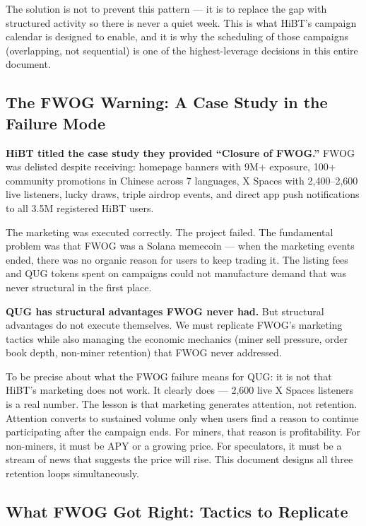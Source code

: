 \documentclass[11pt,a4paper]{article}
\begin{document}
The solution is not to prevent this pattern — it is to replace the gap with structured activity so there is never a quiet week. This is what HiBT's campaign calendar is designed to enable, and it is why the scheduling of those campaigns (overlapping, not sequential) is one of the highest-leverage decisions in this entire document.

\subsection{The FWOG Warning: A Case Study in the Failure Mode}
\label{sec:fwog}

\begin{tcolorbox}[redbox]
\textbf{HiBT titled the case study they provided ``Closure of FWOG.''} FWOG was delisted despite receiving: homepage banners with 9M+ exposure, 100+ community promotions in Chinese across 7 languages, X Spaces with 2,400--2,600 live listeners, lucky draws, triple airdrop events, and direct app push notifications to all 3.5M registered HiBT users.

The marketing was executed correctly. The project failed. The fundamental problem was that FWOG was a Solana memecoin — when the marketing events ended, there was no organic reason for users to keep trading it. The listing fees and QUG tokens spent on campaigns could not manufacture demand that was never structural in the first place.

\textbf{QUG has structural advantages FWOG never had.} But structural advantages do not execute themselves. We must replicate FWOG's marketing tactics while also managing the economic mechanics (miner sell pressure, order book depth, non-miner retention) that FWOG never addressed.
\end{tcolorbox}

To be precise about what the FWOG failure means for QUG: it is not that HiBT's marketing does not work. It clearly does — 2,600 live X Spaces listeners is a real number. The lesson is that marketing generates attention, not retention. Attention converts to sustained volume only when users find a reason to continue participating after the campaign ends. For miners, that reason is profitability. For non-miners, it must be APY or a growing price. For speculators, it must be a stream of news that suggests the price will rise. This document designs all three retention loops simultaneously.

\subsection{What FWOG Got Right: Tactics to Replicate}
\end{document}
